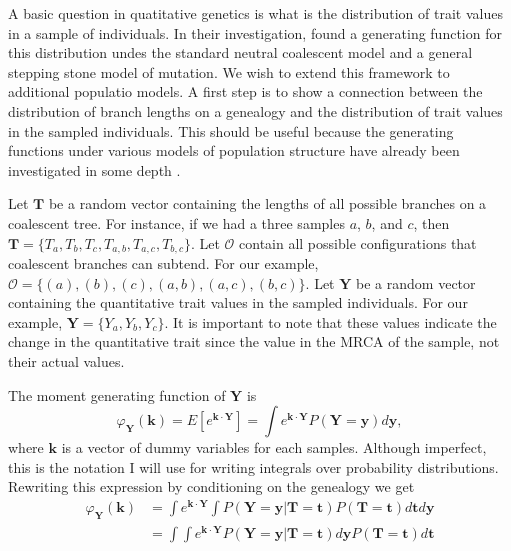 A basic question in quatitative genetics is what is the distribution of trait
values in a sample of individuals. In their investigation, \citet{Schraiber2015}
found a generating function for this distribution undes the standard neutral
coalescent model and a general stepping stone model of mutation. We wish to
extend this framework to additional populatio models. A first step is to show a
connection between the distribution of branch lengths on a genealogy and the
distribution of trait values in the sampled individuals. This should be useful
because the generating functions under various models of population structure
have already been investigated in some depth \citep{Lohse2011}.

Let $\mathbf{T}$ be a random vector containing the lengths of all possible
branches on a coalescent tree. For instance, if we had a three samples $a$, $b$,
and $c$, then $\mathbf{T}=\{T_a,T_b,T_c,T_{a,b},T_{a,c},T_{b,c}\}$. Let
$\mathcal{O}$ contain all possible configurations that coalescent branches can
subtend. For our example, $\mathcal{O}=\{(a),(b),(c),(a,b),(a,c),(b,c)\}$. Let
$\mathbf{Y}$ be a random vector containing the quantitative trait values in the
sampled individuals. For our example, $\mathbf{Y}=\{Y_a,Y_b,Y_c\}$. It is
important to note that these values indicate the change in the quantitative
trait since the value in the MRCA of the sample, not their actual values.

The moment generating function of $\mathbf{Y}$ is
\begin{equation}
  \varphi_{\mathbf{Y}}(\mathbf{k}) = E\left[ e^{\mathbf{k} \cdot \mathbf{Y}} \right] =
  \int e^{\mathbf{k} \cdot \mathbf{Y}} P(\mathbf{Y}=\mathbf{y}) d\mathbf{y},
\end{equation}
where $\mathbf{k}$ is a vector of dummy variables for each
samples. Although imperfect, this is the notation I will use for
writing integrals over probability distributions. Rewriting this
expression by conditioning on the genealogy we get
\begin{align}
  \varphi_{\mathbf{Y}}(\mathbf{k}) &= \int e^{\mathbf{k} \cdot \mathbf{Y}}
  \int P(\mathbf{Y}=\mathbf{y} | \mathbf{T}=\mathbf{t}) P(\mathbf{T}=\mathbf{t})
  d\mathbf{t} d\mathbf{y}\\
  &= \int \int e^{\mathbf{k} \cdot \mathbf{Y}} P(\mathbf{Y}=\mathbf{y} | \mathbf{T}=\mathbf{t}) d\mathbf{y}
  P(\mathbf{T}=\mathbf{t})
  d\mathbf{t}
\end{align}

